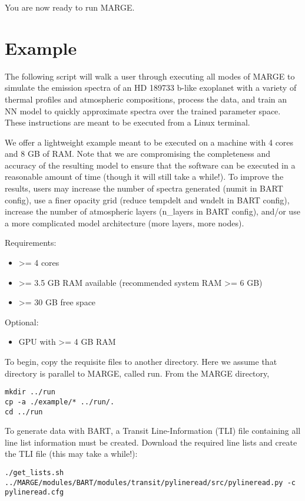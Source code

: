 \documentclass[letterpaper, 12pt]{article}
\begin{document}
\noindent You are now ready to run MARGE.


\section{Example}
\label{sec:example}

\noindent The following script will walk a user through executing all modes of 
MARGE to simulate the emission spectra of an HD 189733 b-like exoplanet with a 
variety of thermal profiles and atmospheric compositions, process the data, and 
train an NN model to quickly approximate spectra over the trained parameter 
space.  These instructions are meant to be executed from a Linux terminal.  

We offer a lightweight example meant to be executed on a machine with 4 cores 
and 8 GB of RAM.  Note that we are compromising the completeness and accuracy 
of the resulting model to ensure that the software can be executed in a 
reasonable amount of time (though it will still take a while!).  To improve 
the results, users may increase the number of spectra generated (numit in BART 
config), use a finer opacity grid (reduce tempdelt and wndelt in BART config), 
increase the number of atmospheric layers (n\_layers in BART config), and/or 
use a more complicated model architecture (more layers, more nodes).

\noindent Requirements:
\begin{itemize}
\item >= 4 cores
\item >= 3.5 GB RAM available (recommended system RAM >= 6 GB)
\item >= 30 GB free space
\end{itemize}

\noindent Optional:
\begin{itemize}
\item GPU with >= 4 GB RAM
\end{itemize}

\noindent To begin, copy the requisite files to another directory.  Here we 
assume that directory is parallel to MARGE, called run.  From the MARGE 
directory,
\begin{verbatim}
mkdir ../run
cp -a ./example/* ../run/.
cd ../run
\end{verbatim}

\noindent To generate data with BART, a Transit Line-Information (TLI) file 
containing all line list information must be created.  Download the required 
line lists and create the TLI file (this may take a while!):
\begin{verbatim}
./get_lists.sh
../MARGE/modules/BART/modules/transit/pylineread/src/pylineread.py -c pylineread.cfg
\end{verbatim}
\end{document}
